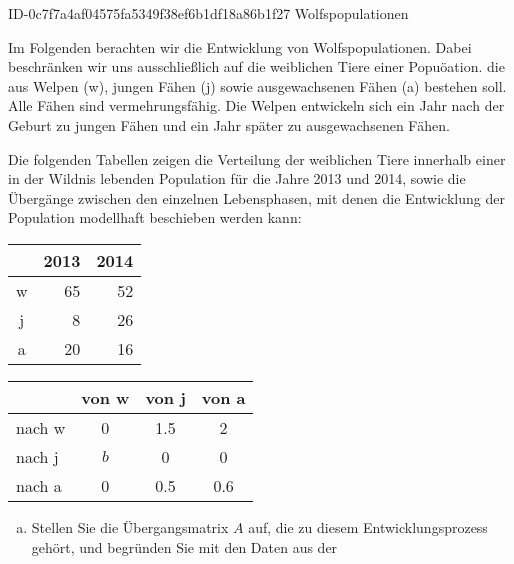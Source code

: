 \begin{exercise}
      {ID-0c7f7a4af04575fa5349f38ef6b1df18a86b1f27}
      {Wolfspopulationen}
  \ifproblem\problem\par
    Im Folgenden berachten wir die Entwicklung von
    Wolfspopulationen. Dabei beschränken wir uns
    ausschließlich auf die weiblichen Tiere einer
    Popuöation. die aus Welpen (w), jungen Fähen (j)
    sowie ausgewachsenen Fähen (a) bestehen soll.
    Alle Fähen sind vermehrungsfähig. Die Welpen
    entwickeln sich ein Jahr nach der Geburt zu
    jungen Fähen und ein Jahr später zu
    ausgewachsenen Fähen.
    \par
    Die folgenden Tabellen zeigen die Verteilung
    der weiblichen Tiere innerhalb einer in der
    Wildnis lebenden Population für die Jahre 2013
    und 2014, sowie die Übergänge zwischen den
    einzelnen Lebensphasen, mit denen die
    Entwicklung der Population modellhaft
    beschieben werden kann:
    \begin{center}
      \begingroup
        \renewcommand{\arraystretch}{1.2}%
        \begin{tabular}{|c|r|r|}
          \hline
            & 2013 & 2014 \\
          \hline
          w &   65 &   52 \\
          \hline
          j &    8 &   26 \\
          \hline
          a &   20 &   16 \\
          \hline
        \end{tabular}%
        \hspace{3em}%
        \begin{tabular}{|l|c|c|c|}
          \hline
                 & von w   & von j     & von a     \\
          \hline
          nach w & \num{0} & \num{1.5} & \num{2}   \\
          \hline
          nach j & $b$     & \num{0}   & \num{0}   \\
          \hline
          nach a & \num{0} & \num{0.5} & \num{0.6} \\
          \hline
        \end{tabular}
      \endgroup
    \end{center}
    \begin{enumerate}[a)]
      \item Stellen Sie die Übergangsmatrix $A$ auf,
            die zu diesem Entwicklungsprozess gehört,
            und begründen Sie mit den Daten aus der

\end{enumerate}
\end{exercise}
